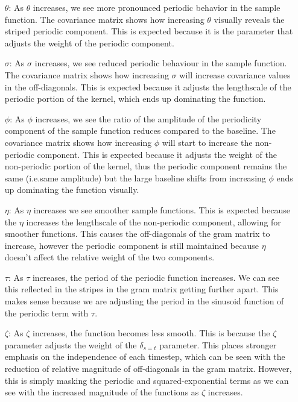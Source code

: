 \documentclass[12pt]{article}
\begin{document}
\begin{itemize}
\item [$\theta$:] As $\theta$ increases, we see more pronounced periodic behavior in the sample function.
    The covariance matrix shows how increasing $\theta$ visually reveals the striped periodic component.
        This is expected because it is the parameter that adjusts the weight of the periodic component.
\item [$\sigma$:] As $\sigma$ increases, we see reduced periodic behaviour in the sample function.
    The covariance matrix shows how increasing $\sigma$ will increase covariance values in the off-diagonals.
    This is expected because it adjusts the lengthscale of the periodic portion of the kernel, which ends up dominating the function.
\item [$\phi$:] As $\phi$ increases, we see the ratio of the amplitude of the periodicity component of the sample function reduces compared to the baseline.
    The covariance matrix shows how increasing $\phi$ will start to increase the non-periodic component.
    This is expected because it adjusts the weight of the non-periodic portion of the kernel, thus the periodic component remains the same (i.e.same amplitude) but the large baseline shifts from increasing $\phi$ ends up dominating the function visually.
\item [$\eta$:] As $\eta$ increases we see smoother sample functions.
This is expected because the $\eta$ increases the lengthscale of the non-periodic component, allowing for smoother functions.
This causes the off-diagonals of the gram matrix to increase, however the periodic component is still maintained because $\eta$ doesn't affect the relative weight of the two components.
\item [$\tau$:] As $\tau$ increases, the period of the periodic function increases.
We can see this reflected in the stripes in the gram matrix getting further apart.
This makes sense because we are adjusting the period in the sinusoid function of the periodic term with $\tau$.
\item [$\zeta$:] As $\zeta$ increases, the function becomes less smooth.
    This is because the $\zeta$ parameter adjusts the weight of the $\delta_{s=t}$ parameter.
    This places stronger emphasis on the independence of each timestep, which can be seen with the reduction of relative magnitude of off-diagonals in the gram matrix.
    However, this is simply masking the periodic and squared-exponential terms as we can see with the increased magnitude of the functions as $\zeta$ increases.
\end{itemize}
\newpage
\end{document}

